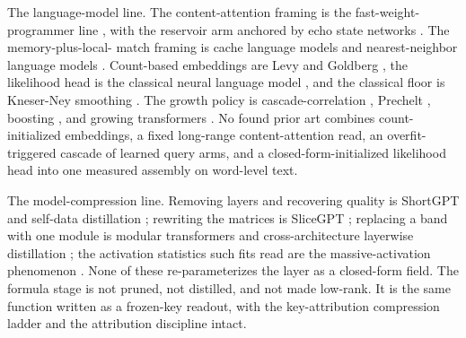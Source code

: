 \documentclass[11pt]{article}
\begin{document}
The language-model line. The content-attention framing is the
fast-weight-programmer line \cite{schmidhuber1992, ba2016,
schlag2021, irie2021, irie2022}, with the reservoir arm anchored
by echo state networks \cite{jaeger2001}. The memory-plus-local-
match framing is cache language models \cite{grave2017} and
nearest-neighbor language models \cite{khandelwal2019}.
Count-based embeddings are Levy and Goldberg \cite{levy2014}, the
likelihood head is the classical neural language model
\cite{bengio2003, mikolov2010}, and the classical floor is
Kneser-Ney smoothing \cite{kneser1995}. The growth policy is
cascade-correlation \cite{fahlman1990}, Prechelt \cite{prechelt1998},
boosting \cite{friedman2001}, and growing transformers
\cite{growing2025}. No found prior art combines
count-initialized embeddings, a fixed long-range content-attention
read, an overfit-triggered cascade of learned query arms, and a
closed-form-initialized likelihood head into one measured assembly
on word-level text.

The model-compression line. Removing layers and recovering quality
is ShortGPT \cite{shortgpt2024} and self-data distillation
\cite{selfdataddistill2025}; rewriting the matrices is SliceGPT
\cite{slicegpt2024}; replacing a band with one module is modular
transformers \cite{modulartransformers2023} and cross-architecture
layerwise distillation \cite{cald2025}; the activation statistics
such fits read are the massive-activation phenomenon
\cite{sun2024massive, shiexplain2026, ramanoutlier2025}. None of
these re-parameterizes the layer as a closed-form field. The
formula stage is not pruned, not distilled, and not made low-rank.
It is the same function written as a frozen-key readout, with the
key-attribution compression ladder and the attribution discipline
intact.
\end{document}
